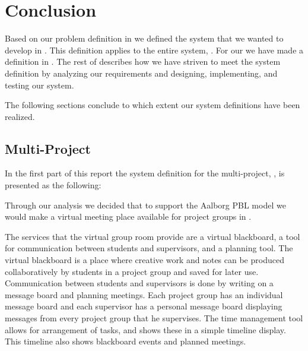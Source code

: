 \chapter{Conclusion}
\label{chap:conclusion}

Based on our problem definition in  we defined the system that we wanted to develop in .
This definition applies to the entire system, \system{}.
For our \subsystem{} we have made a definition in . 
The rest of  describes how we have striven to meet the system definition by analyzing our requirements and designing,  implementing, and testing our system.

The following sections conclude to which extent our system definitions have been realized.

\section{Multi-Project}
\label{sec:multiconclusion}
In the first part of this report the system definition for the multi-project, \system{}, is presented as the following: 



Through our analysis we decided that to support the Aalborg PBL model we would make a virtual meeting place available for project groups in \moodle{}.

The services that the virtual group room provide are a virtual blackboard, a tool for communication between students and supervisors, and a planning tool.
The virtual blackboard is a place where creative work and notes can be produced collaboratively by students in a project group and saved for later use.
Communication between students and supervisors is done by writing on a message board and planning meetings.
Each project group has an individual message board and each supervisor has a personal message board displaying messages from every project group that he supervises.
The time management tool allows for arrangement of tasks, and shows these in a simple timeline display.
This timeline also shows blackboard events and planned meetings.


